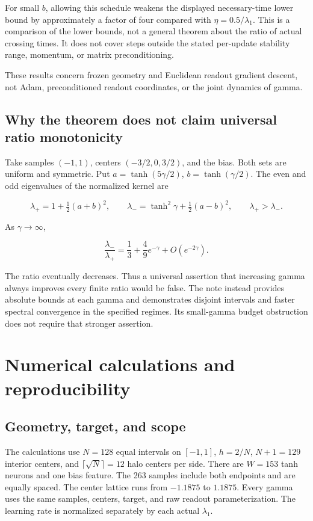 \documentclass[11pt]{article}
\begin{document}
For small \(b\), allowing this schedule weakens the displayed necessary-time lower bound by approximately a factor of four compared with \(\eta=0.5/\lambda_1\). This is a comparison of the lower bounds, not a general theorem about the ratio of actual crossing times. It does not cover steps outside the stated per-update stability range, momentum, or matrix preconditioning.

These results concern frozen geometry and Euclidean readout gradient descent, not Adam, preconditioned readout coordinates, or the joint dynamics of gamma.

\subsection{Why the theorem does not claim universal ratio monotonicity}

Take samples \((-1,1)\), centers \((-3/2,0,3/2)\), and the bias. Both sets are uniform and symmetric. Put \(a=\tanh(5\gamma/2)\), \(b=\tanh(\gamma/2)\). The even and odd eigenvalues of the normalized kernel are

\[
\lambda_+=1+\tfrac12(a+b)^2,
\qquad
\lambda_-=\tanh^2\gamma+\tfrac12(a-b)^2,
\qquad\lambda_+>\lambda_-.
\]

As \(\gamma\to\infty\),

\[
\frac{\lambda_-}{\lambda_+}
=\frac13+\frac49e^{-\gamma}+O(e^{-2\gamma}).
\]

The ratio eventually decreases. Thus a universal assertion that increasing gamma always improves every finite ratio would be false. The note instead provides absolute bounds at each gamma and demonstrates disjoint intervals and faster spectral convergence in the specified regimes. Its small-gamma budget obstruction does not require that stronger assertion.

\section{Numerical calculations and reproducibility}

\subsection{Geometry, target, and scope}

The calculations use \(N=128\) equal intervals on \([-1,1]\), \(h=2/N\), \(N+1=129\) interior centers, and \(\lceil\sqrt N\rceil=12\) halo centers per side. There are \(W=153\) tanh neurons and one bias feature. The 263 samples include both endpoints and are equally spaced. The center lattice runs from \(-1.1875\) to \(1.1875\). Every gamma uses the same samples, centers, target, and raw readout parameterization. The learning rate is normalized separately by each actual \(\lambda_1\).
\end{document}
